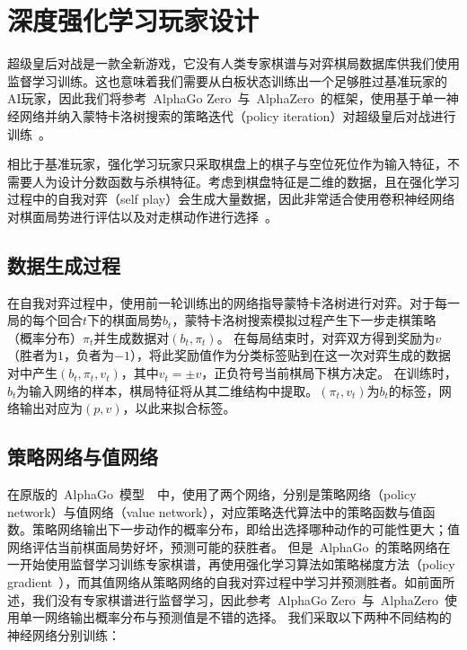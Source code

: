 \section{深度强化学习玩家设计}
超级皇后对战是一款全新游戏，它没有人类专家棋谱与对弈棋局数据库供我们使用监督学习训练。这也意味着我们需要从白板状态训练出一个足够胜过基准玩家的AI玩家，因此我们将参考~AlphaGo Zero~与~AlphaZero~的框架，使用基于单一神经网络并纳入蒙特卡洛树搜索的策略迭代（policy iteration）对超级皇后对战进行训练~\cite{Silver1140,Silver2017,Silver2016}。

相比于基准玩家，强化学习玩家只采取棋盘上的棋子与空位死位作为输入特征，不需要人为设计分数函数与杀棋特征。考虑到棋盘特征是二维的数据，且在强化学习过程中的自我对弈（self play）会生成大量数据，因此非常适合使用卷积神经网络对棋面局势进行评估以及对走棋动作进行选择~\cite{Silver2016}。

\subsection{数据生成过程}
在自我对弈过程中，使用前一轮训练出的网络指导蒙特卡洛树进行对弈。对于每一局的每个回合$t$下的棋面局势$b_{t}$，蒙特卡洛树搜索模拟过程产生下一步走棋策略（概率分布）$\pi_{t}$并生成数据对$(b_{t},\pi_{t})$。
在每局结束时，对弈双方得到奖励为$v$（胜者为$1$，负者为$-1$），将此奖励值作为分类标签贴到在这一次对弈生成的数据对中产生$(b_{t},\pi_{t},v_{t})$，其中$v_{t}=\pm v$，正负符号当前棋局下棋方决定。
在训练时，$b_{t}$为输入网络的样本，棋局特征将从其二维结构中提取。$(\pi_{t},v_{t})$为$b_{t}$的标签，网络输出对应为$(p,v)$，以此来拟合标签。
\subsection{策略网络与值网络}
在原版的~AlphaGo~模型~\cite{Silver2016}~中，使用了两个网络，分别是策略网络（policy network）与值网络（value network），对应策略迭代算法中的策略函数与值函数。策略网络输出下一步动作的概率分布，即给出选择哪种动作的可能性更大；值网络评估当前棋面局势好坏，预测可能的获胜者。
但是~AlphaGo~的策略网络在一开始使用监督学习训练专家棋谱，再使用强化学习算法如策略梯度方法（policy gradient~\cite{silver2014deterministic}），而其值网络从策略网络的自我对弈过程中学习并预测胜者。如前面所述，我们没有专家棋谱进行监督学习，因此参考~AlphaGo Zero~与~AlphaZero~使用单一网络输出概率分布与预测值是不错的选择。
我们采取以下两种不同结构的神经网络分别训练：
